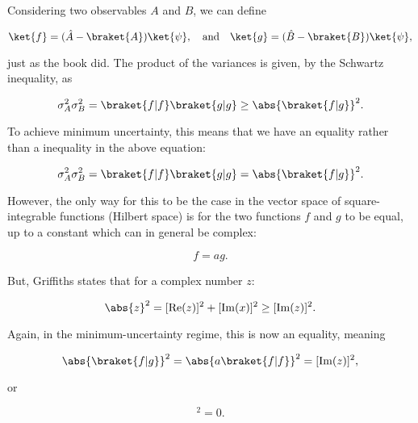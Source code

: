 \section{}

Considering two observables $A$ and $B$, we can define 

\begin{equation}
    \ket{f} = (\hat{A} - \braket{A})\ket{\psi}, \quad\mathrm{and}\quad \ket{g} = (\hat{B} - \braket{B})\ket{\psi},
\end{equation}

just as the book did. The product of the variances is given, by the Schwartz inequality, as

\begin{equation}
    \sigma_A^2\sigma_B^2 = \braket{f|f}\braket{g|g} \geq \abs{\braket{f|g}}^2.
\end{equation}

To achieve minimum uncertainty, this means that we have an equality rather than a inequality in the above equation:

\begin{equation}
    \sigma_A^2\sigma_B^2 = \braket{f|f}\braket{g|g} = \abs{\braket{f|g}}^2.
\end{equation}

However, the only way for this to be the case in the vector space of square-integrable functions (Hilbert space) is for the two functions $f$ and $g$ to be equal, up to a constant which can in general be complex:

\begin{equation}
    f = ag.
\end{equation}

But, Griffiths states that for a complex number $z$:

\begin{equation}
    \abs{z}^2 = [\mathrm{Re}(z)]^2 + [\mathrm{Im}(x)]^2 \geq [\mathrm{Im}(z)]^2.
\end{equation}

Again, in the minimum-uncertainty regime, this is now an equality, meaning

\begin{equation}
    \abs{\braket{f|g}}^2 = \abs{a\braket{f|f}}^2 = [\mathrm{Im}(z)]^2,
\end{equation}

or 

\begin{equation}
    [\mathrm{Re}(a\braket{f|f})]^2 = 0.
\end{equation}


